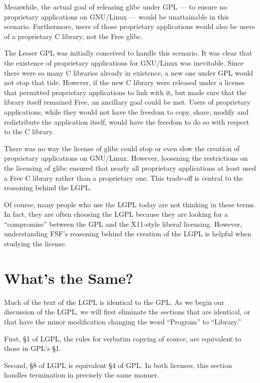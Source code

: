 \documentclass[11pt, letterpaper]{book}
\begin{document}
Meanwhile, the actual goal of releasing glibc under GPL --- to ensure no
proprietary applications on GNU/Linux --- would be unattainable in this
scenario. Furthermore, users of those proprietary applications would also
be users of a proprietary C library, not the Free glibc.

The Lesser GPL was initially conceived to handle this scenario. It was
clear that the existence of proprietary applications for GNU/Linux was
inevitable. Since there were so many C libraries already in existence, a
new one under GPL would not stop that tide. However, if the new C library
were released under a license that permitted proprietary applications
to link with it, but made sure that the library itself remained Free,
an ancillary goal could be met. Users of proprietary applications, while
they would not have the freedom to copy, share, modify and redistribute
the application itself, would have the freedom to do so with respect to
the C library.

There was no way the license of glibc could stop or even slow the creation
of proprietary applications on GNU/Linux. However, loosening the
restrictions on the licensing of glibc ensured that nearly all proprietary
applications at least used a Free C library rather than a proprietary one.
This trade-off is central to the reasoning behind the LGPL\@.

Of course, many people who use the LGPL today are not thinking in these
terms. In fact, they are often choosing the LGPL because they are looking
for a ``compromise'' between the GPL and the X11-style liberal licensing.
However, understanding FSF's reasoning behind the creation of the LGPL is
helpful when studying the license.


\section{What's the Same?}

Much of the text of the LGPL is identical to the GPL\@. As we begin our
discussion of the LGPL, we will first eliminate the sections that are
identical, or that have the minor modification changing the word
``Program'' to ``Library.''

First, \S 1 of LGPL, the rules for verbatim copying of source, are
equivalent to those in GPL's \S 1.

Second, \S 8 of LGPL is equivalent \S 4 of GPL\@. In both licenses, this
section handles termination in precisely the same manner.
\end{document}
